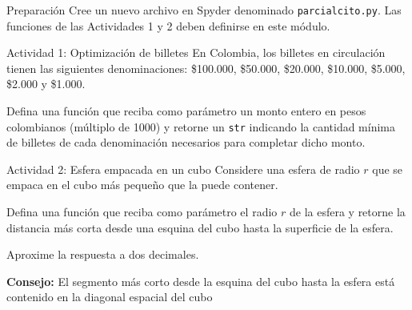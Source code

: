 \documentclass{ip-lab}
\begin{document}
\maketitle

\begin{sectionbox}{Preparación}
    Cree un nuevo archivo en Spyder denominado \texttt{parcialcito.py}. Las funciones de las Actividades 1 y 2 deben definirse en este módulo.
\end{sectionbox}

\begin{sectionbox}{Actividad 1: Optimización de billetes}
En Colombia, los billetes en circulación tienen las siguientes denominaciones: \$100.000, \$50.000, \$20.000, \$10.000, \$5.000, \$2.000 y \$1.000.

Defina una función que reciba como parámetro un monto entero en pesos colombianos (múltiplo de 1000) y retorne un \verb|str| indicando la cantidad mínima de billetes de cada denominación necesarios para completar dicho monto.
\end{sectionbox}

\begin{sectionbox}{Actividad 2: Esfera empacada en un cubo}
Considere una esfera de radio $r$ que se empaca en el cubo más pequeño que la puede contener.

\begin{center}
\end{center}

Defina una función que reciba como parámetro el radio $r$ de la esfera y retorne la distancia más corta desde una esquina del cubo hasta la superficie de la esfera.

Aproxime la respuesta a dos decimales.

\textbf{Consejo:} El segmento más corto desde la esquina del cubo hasta la esfera está contenido en la diagonal espacial del cubo
\end{sectionbox}
\end{document}
